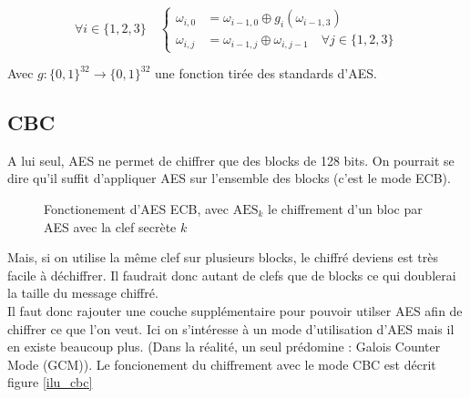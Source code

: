 \documentclass[a4paper, 12pt]{article}
\begin{document}
$$
\forall i \in \{1,2,3\} \quad 
\begin{cases}
	\omega_{i,0} &= \omega_{i-1,0} \oplus g_i(\omega_{i-1,3}) \\
	\omega_{i,j} &= \omega_{i-1,j} \oplus \omega_{i,j-1} \quad \forall j \in \{1,2,3\} 
\end{cases}
$$

\noindent Avec $g: \{0,1\}^{32} \rightarrow \{0,1\}^{32}$ une fonction tirée des standards d'AES. 

\subsection{CBC}\label{sectioncbc}
A lui seul, AES ne permet de chiffrer que des blocks de 128 bits. On pourrait se dire qu'il suffit d'appliquer AES sur l'ensemble des blocks (c'est le mode ECB). 

\begin{figure}[h]
\centering
{}
\caption{Fonctionement d'AES ECB, avec $\text{AES}_k$ le chiffrement d'un bloc par AES avec la clef secrète $k$}
\label{ilu_ECB}
\end{figure}

Mais, si on utilise la même clef sur plusieurs blocks, le chiffré deviens est très facile à déchiffrer. Il faudrait donc autant de clefs que de blocks ce qui doublerai la taille du message chiffré. \\

Il faut donc rajouter une couche supplémentaire pour pouvoir utilser AES afin de chiffrer ce que l'on veut. Ici on s'intéresse à un mode d'utilisation d'AES mais il en existe beaucoup plus. (Dans la réalité, un seul prédomine : Galois Counter Mode (GCM)). Le foncionement du chiffrement avec le mode CBC est décrit figure \ref{ilu_cbc}
\end{document}
